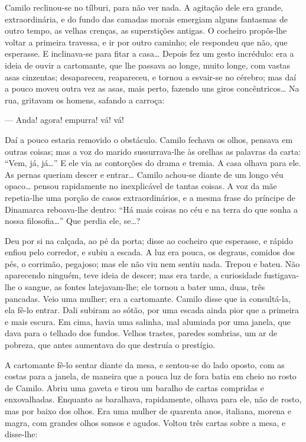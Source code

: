 Camilo reclinou-se no tílburi, para não ver nada. A agitação dele era
grande, extraordinária, e do fundo das camadas morais emergiam alguns
fantasmas de outro tempo, as velhas crenças, as superstições antigas. O
cocheiro propôs-lhe voltar a primeira travessa, e ir por outro caminho;
ele respondeu que não, que esperasse. E inclinava-se para fitar a
casa\ldots{} Depois fez um gesto incrédulo: era a ideia de ouvir a
cartomante, que lhe passava ao longe, muito longe, com vastas asas
cinzentas; desapareceu, reapareceu, e tornou a esvair-se no cérebro; mas
daí a pouco moveu outra vez as asas, mais perto, fazendo uns giros
concêntricos\ldots{} Na rua, gritavam os homens, safando a carroça:

--- Anda! agora! empurra! vá! vá!

Daí a pouco estaria removido o obstáculo. Camilo fechava os olhos,
pensava em outras coisas; mas a voz do marido sussurrava-lhe às orelhas
as palavras da carta: ``Vem, já, já\ldots{}'' E ele via as contorções do
drama e tremia. A casa olhava para ele. As pernas queriam descer e
entrar\ldots{} Camilo achou-se diante de um longo véu opaco\ldots{}
pensou rapidamente no inexplicável de tantas coisas. A voz da mãe
repetia-lhe uma porção de casos extraordinários, e a mesma frase do
príncipe de Dinamarca reboava-lhe dentro: ``Há mais coisas no céu e na
terra do que sonha a nossa filosofia\ldots{}'' Que perdia ele,
se\ldots{}?

Deu por si na calçada, ao pé da porta; disse ao cocheiro que esperasse,
e rápido enfiou pelo corredor, e subiu a escada. A luz era pouca, os
degraus, comidos dos pés, o corrimão, pegajoso; mas ele não viu nem
sentiu nada. Trepou e bateu. Não aparecendo ninguém, teve ideia de
descer; mas era tarde, a curiosidade fustigava-lhe o sangue, as fontes
latejavam-lhe; ele tornou a bater uma, duas, três pancadas. Veio uma
mulher; era a cartomante. Camilo disse que ia consultá-la, ela fê-lo
entrar. Dali subiram ao sótão, por uma escada ainda pior que a primeira
e mais escura. Em cima, havia uma salinha, mal alumiada por uma janela,
que dava para o telhado dos fundos. Velhos trastes, paredes sombrias, um
ar de pobreza, que antes aumentava do que destruía o prestígio.

A cartomante fê-lo sentar diante da mesa, e sentou-se do lado oposto,
com as costas para a janela, de maneira que a pouca luz de fora batia em
cheio no rosto de Camilo. Abriu uma gaveta e tirou um baralho de cartas
compridas e enxovalhadas. Enquanto as baralhava, rapidamente, olhava
para ele, não de rosto, mas por baixo dos olhos. Era uma mulher de
quarenta anos, italiana, morena e magra, com grandes olhos sonsos e
agudos. Voltou três cartas sobre a mesa, e disse-lhe:

